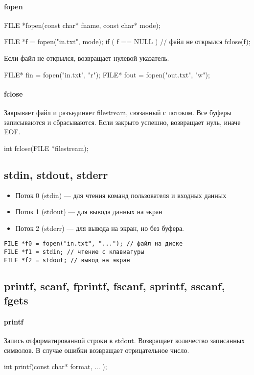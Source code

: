 \paragraph{fopen}
\begin{ccode}
FILE *fopen(const char* fname, const char* mode);

FILE *f = fopen("in.txt", mode);
if ( f == NULL ) {
    // файл не открылся
}
fclose(f);
\end{ccode}
Если файл не открылся, возвращает нулевой указатель. 
\begin{ccode}
FILE* fin = fopen("in.txt", "r");
FILE* fout = fopen("out.txt", "w");
\end{ccode}
\paragraph{fclose}
Закрывает файл и разъединяет filestream, связанный с потоком. Все буферы записываются и сбрасываются. Если закрыто успешно, возвращает нуль, иначе EOF.
\begin{ccode}
int fclose(FILE *filestream);
\end{ccode}
\subsection{stdin, stdout, stderr}
\begin{itemize}[noitemsep]
    \item Поток 0 (stdin) --- для чтения команд пользователя и входных данных
    \item Поток 1 (stdout) --- для вывода данных на экран
    \item Поток 2 (stderr) --- для вывода на экран, но без буфера.
\end{itemize}
\begin{verbatim}
FILE *f0 = fopen("in.txt", "..."); // файл на диске
FILE *f1 = stdin; // чтение с клавиатуры
FILE *f2 = stdout; // вывод на экран
\end{verbatim}
\subsection{printf, scanf, fprintf, fscanf, sprintf, sscanf, fgets}
\paragraph{printf}
Запись отформатированной строки в stdout. Возвращает количество записанных символов. В случае ошибки возвращает отрицательное число.
\begin{ccode}
int printf(const char* format, ... );
\end{ccode}
